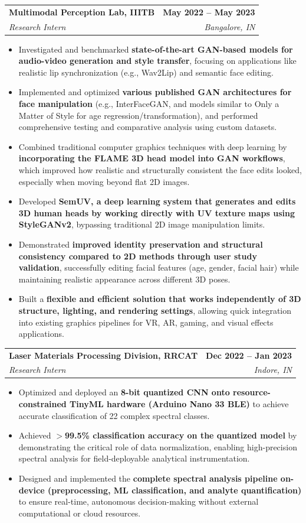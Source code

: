 \documentclass[letterpaper,11pt]{article}
\makeatletter
\newcommand{\resumeItem}[1]{
  \item\small{
    {#1 \vspace{-2pt}}
  }
}
\newcommand{\resumeSubheading}[4]{
  \vspace{-2pt}\item
    \begin{tabular*}{1.0\textwidth}[t]{l@{\extracolsep{\fill}}r}
      \textbf{#1} & \textbf{\small #2} \\
      \textit{\small#3} & \textit{\small #4} \\
    \end{tabular*}\vspace{-7pt}
}
\newcommand{\resumeItemListStart}{\begin{itemize}}
\newcommand{\resumeItemListEnd}{\end{itemize}\vspace{-5pt}}
\makeatother
\begin{document}
\resumeSubheading
{Multimodal Perception Lab, IIITB}{May 2022 -- May 2023}
{Research Intern}{Bangalore, IN}
\resumeItemListStart
\resumeItem{Investigated and benchmarked \textbf{state-of-the-art GAN-based models for audio-video generation and style transfer}, focusing on applications like realistic lip synchronization (e.g., Wav2Lip) and semantic face editing.}
\resumeItem{Implemented and optimized \textbf{various published GAN architectures for face manipulation} (e.g., InterFaceGAN, and models similar to Only a Matter of Style for age regression/transformation), and performed comprehensive testing and comparative analysis using custom datasets.}
\resumeItem{Combined traditional computer graphics techniques with deep learning by \textbf{incorporating the FLAME 3D head model into GAN workflows}, which improved how realistic and structurally consistent the face edits looked, especially when moving beyond flat 2D images.}
\resumeItem{Developed \textbf{SemUV, a deep learning system that generates and edits 3D human heads by working directly with UV texture maps using StyleGANv2}, bypassing traditional 2D image manipulation limits.}
\resumeItem{Demonstrated \textbf{improved identity preservation and structural consistency compared to 2D methods through user study validation}, successfully editing facial features (age, gender, facial hair) while maintaining realistic appearance across different 3D poses.} 
\resumeItem{Built a \textbf{flexible and efficient solution that works independently of 3D structure, lighting, and rendering settings}, allowing quick integration into existing graphics pipelines for VR, AR, gaming, and visual effects applications.}
\resumeItemListEnd

\resumeSubheading
{Laser Materials Processing Division, RRCAT}{Dec 2022 -- Jan 2023}
{Research Intern}{Indore, IN}
\resumeItemListStart
\resumeItem{Optimized and deployed an \textbf{8-bit quantized CNN onto resource-constrained TinyML hardware (Arduino Nano 33 BLE)} to achieve accurate classification of 22 complex spectral classes.}
\resumeItem{Achieved \textbf{$>$99.5\% classification accuracy on the quantized model} by demonstrating the critical role of data normalization, enabling high-precision spectral analysis for field-deployable analytical instrumentation.}
\resumeItem{Designed and implemented the \textbf{complete spectral analysis pipeline on-device (preprocessing, ML classification, and analyte quantification)} to ensure real-time, autonomous decision-making without external computational or cloud resources.}
\resumeItemListEnd
\end{document}
